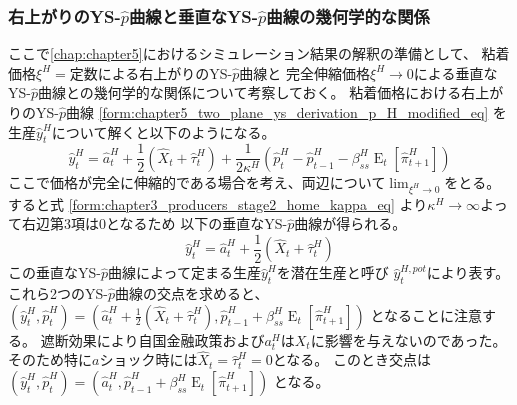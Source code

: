 \subsubsection{右上がりのYS-\(\hat{p}\)曲線と垂直なYS-\(\hat{p}\)曲線の幾何学的な関係}
\label{sec:chapter5_two_plane_ys_potential}
ここで\ref{chap:chapter5}におけるシミュレーション結果の解釈の準備として、
粘着価格\(\xi^H=\text{定数}\)による右上がりのYS-\(\hat{p}\)曲線と
完全伸縮価格\(\xi^H\to0\)による垂直なYS-\(\hat{p}\)曲線との幾何学的な関係について考察しておく。
粘着価格における右上がりのYS-\(\hat{p}\)曲線
\eqref{form:chapter5_two_plane_ys_derivation_p_H_modified_eq}
を生産\(\hat{y}_t^H\)について解くと以下のようになる。
\begin{equation}
\label{form:chapter5_two_plane_ys_potential_y_H_eq}
    \hat{y}_t^H=\hat{a}_t^H+\frac{1}{2}(\hat{X}_t+\hat{\tau}_t^H)+\frac{1}{2\kappa^H}(\hat{p}_t^H-\hat{p}_{t-1}^H-\beta_{ss}^H\operatorname{E}_t[\hat{\pi}_{t+1}^H])
\end{equation}
ここで価格が完全に伸縮的である場合を考え、両辺について\(\lim_{\xi^H\to0}\)をとる。
すると式
\eqref{form:chapter3_producers_stage2_home_kappa_eq}
より\(\kappa^H\to\infty\)よって右辺第3項は\(0\)となるため
以下の垂直なYS-\(\hat{p}\)曲線が得られる。
\begin{equation}
\label{form:chapter5_two_plane_ys_potential_y_H_pot_eq}
    \hat{y}_t^H=\hat{a}_t^H+\frac{1}{2}(\hat{X}_t+\hat{\tau}_t^H)
\end{equation}
この垂直なYS-\(\hat{p}\)曲線によって定まる生産\(\hat{y}_t^H\)を潜在生産と呼び
\(\hat{y}_t^{H,pot}\)により表す。
これら2つのYS-\(\hat{p}\)曲線の交点を求めると、
\((\hat{y}_t^H, \hat{p}_t^H)=\left(\hat{a}_t^H+\frac{1}{2}(\hat{X}_t+\hat{\tau}_t^H), \hat{p}_{t-1}^H+\beta_{ss}^H\operatorname{E}_t[\hat{\pi}_{t+1}^H]\right)\)
となることに注意する。
遮断効果により自国金融政策および\(a_t^H\)は\(X_t\)に影響を与えないのであった。
そのため特に\(a\)ショック時には\(\hat{X}_t=\hat{\tau}_t^H=0\)となる。
このとき交点は
\((\hat{y}_t^H, \hat{p}_t^H)=\left(\hat{a}_t^H, \hat{p}_{t-1}^H+\beta_{ss}^H\operatorname{E}_t[\hat{\pi}_{t+1}^H]\right)\)
となる。